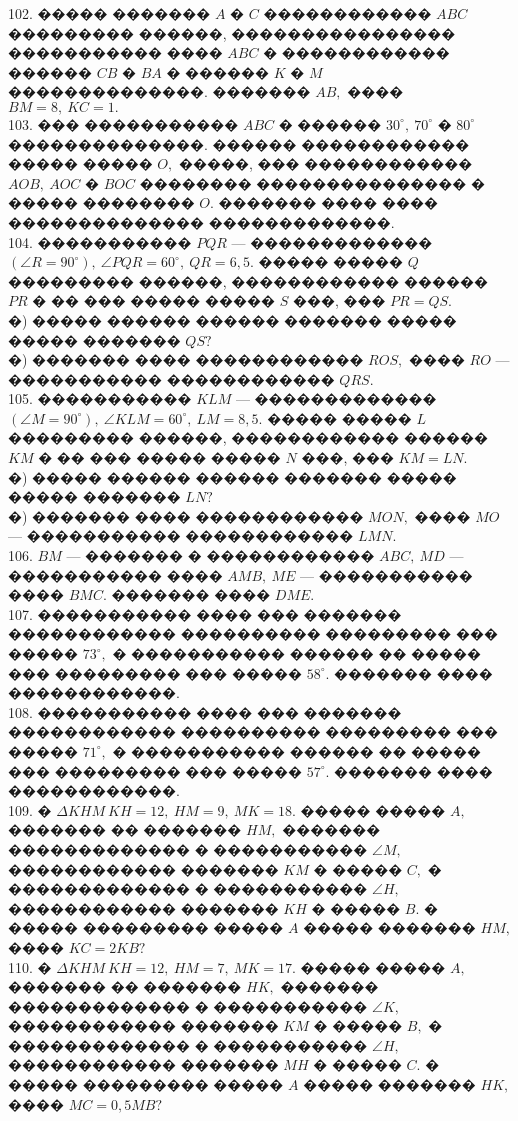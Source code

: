 \documentclass[12pt]{article}
\begin{document}
102. ����� ������� $A$ � $C$ ������������ $ABC$ ��������� ������, ���������������� ����������� ���� $ABC$ � ������������ ������ $CB$ � $BA$ � ������ $K$ � $M$ ��������������. ������� $AB,$ ���� $BM=8,\ KC=1.$\\
103. ��� ����������� $ABC$ � ������ $30^\circ,\ 70^\circ$ � $80^\circ$ ��������������. ������ ������������ ����� ����� $O,$ �����, ��� ������������ $AOB,\ AOC$ � $BOC$ �������� ��������������� � ����� �������� $O.$ ������� ���� ���� �������������� �������������.\\
104. ����������� $PQR$ --- ������������� $(\angle R=90^\circ),\ \angle PQR=60^\circ,\ QR=6,5.$ ����� ����� $Q$ ��������� ������, ������������ ������ $PR$ � �� ��� ����� ����� $S$ ���, ��� $PR=QS.$\\
�) ����� ������ ������ ������� ����� ����� ������� $QS?$\\
�) ������� ���� ������������ $ROS,$ ���� $RO$ --- ����������� ������������ $QRS.$\\
105. ����������� $KLM$ --- ������������� $(\angle M=90^\circ),\ \angle KLM=60^\circ,\ LM=8,5.$ ����� ����� $L$ ��������� ������, ������������ ������ $KM$ � �� ��� ����� ����� $N$ ���, ��� $KM=LN.$\\
�) ����� ������ ������ ������� ����� ����� ������� $LN?$\\
�) ������� ���� ������������ $MON,$ ���� $MO$ --- ����������� ������������ $LMN.$\\
106. $BM$ --- ������� � ������������ $ABC,\ MD$ --- ����������� ���� $AMB,\ ME$ --- ����������� ���� $BMC.$ ������� ���� $DME.$\\
107. ����������� ���� ��� ������� ������������ ���������� ��������� ��� ����� $73^\circ,$ � ����������� ������ �� ����� ��� ��������� ��� ����� $58^\circ.$ ������� ���� ������������.\\
108. ����������� ���� ��� ������� ������������ ���������� ��������� ��� ����� $71^\circ,$ � ����������� ������ �� ����� ��� ��������� ��� ����� $57^\circ.$ ������� ���� ������������.\\
109. � $\Delta KHM\ KH=12,\ HM=9,\ MK=18.$ ����� ����� $A,$ ������� �� ������� $HM,$ ������� ������������� � ����������� $\angle M,$ ������������ ������� $KM$ � ����� $C,$ � ������������� � ����������� $\angle H,$ ������������ ������� $KH$ � ����� $B.$ � ����� ��������� ����� $A$ ����� ������� $HM,$ ���� $KC=2KB?$\\
110. � $\Delta KHM\ KH=12,\ HM=7,\ MK=17.$ ����� ����� $A,$ ������� �� ������� $HK,$ ������� ������������� � ����������� $\angle K,$ ������������ ������� $KM$ � ����� $B,$ � ������������� � ����������� $\angle H,$ ������������ ������� $MH$ � ����� $C.$ � ����� ��������� ����� $A$ ����� ������� $HK,$ ���� $MC=0,5MB?$\\
\end{document}
